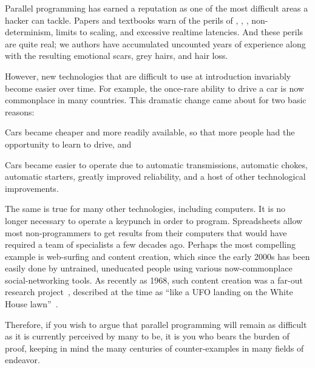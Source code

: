 
%

Parallel programming has earned a reputation as one of the most
difficult areas a hacker can tackle.
Papers and textbooks warn of the perils of , ,
, non-determinism,
 limits to scaling,
and excessive realtime latencies.
And these perils are quite real; we authors have accumulated uncounted
years of experience along with the resulting emotional scars,
grey hairs, and hair loss.

However, new technologies that are difficult to use at introduction
invariably become easier over time.
For example, the once-rare ability to drive a car is now
commonplace in many countries.
This dramatic change came about for two basic reasons:
\begin{enumerate*}[(1)]
\item Cars became cheaper and more readily available, so that
more people had the opportunity to learn to drive, and
\item Cars became easier to operate due to automatic transmissions,
automatic chokes, automatic starters, greatly improved reliability,
and a host of other technological improvements.
\end{enumerate*}

The same is true for many other technologies, including computers.
It is no longer necessary to operate a keypunch in order to program.
Spreadsheets allow most non-programmers to get results from their computers
that would have required a team of specialists a few decades ago.
Perhaps the most compelling example is web-surfing and content creation,
which since the early 2000s has been easily done by
untrained, uneducated people using various now-commonplace
social-networking tools.
As recently as 1968, such content creation was a far-out research
project~\cite{DouglasEngelbart1968}, described at
the time as
``like a UFO landing on the White House lawn''~\cite{ScottGriffen2000}.

Therefore, if you wish to argue that parallel programming will remain
as difficult as it is currently perceived by many to be, it is you
who bears the burden of proof, keeping in mind the many centuries of
counter-examples in many fields of endeavor.

